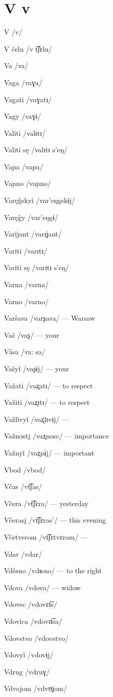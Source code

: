 \chapter{V v}

V /v/

V čelu /v t͡ʃɛlu/

Va /va/

Vaga /vaɣa/

Vagati /vaɣatɪ/

Vagy /vaɣɨ/

Valiti /valɪtɪ/

Valiti sę /valɪtɪ s’eŋ/

Vapa /vapa/

Vapno /vapno/

Varęĝskyǐ /var’eŋgskɨj/

Varęĝy /var’eŋgɨ/

Varijant /varɪʝant/

Variti /varɪtɪ/

Variti sę /varɪtɪ s’eŋ/

Varna /varna/

Varno /varno/

Varšava /varʂava/ — Warsaw

Vaš /vaʂ/ — your

Vása /va: sa/

Vašyǐ /vaʂɨj/ — your

Važati /vaʐatɪ/ — to respect

Važiti /vaʐɪtɪ/ — to respect

Važlivyǐ /vaʐlɪvɨj/ —

Važnostj /vaʐnosc/ — importance

Važnyǐ /vaʐnɨj/ — important

Vbod /vbod/

Včas /vt͡ʃas/

Včera /vt͡ʃɛra/ — yesterday

Včerasj /vt͡ʃɛras’/ — this evening

Včetverom /vt͡ʃɛtvɛrom/ —

Vdar /vdar/

Vděsno /vdᵻsno/ — to the right

Vdova /vdova/ — widow

Vdovec /vdovɛt͡s/

Vdovica /vdovɪt͡sa/

Vdovstvo /vdovstvo/

Vdovyǐ /vdovɨj/

Vdrug /vdruɣ/

Vdvojom /vdvʊʝom/

